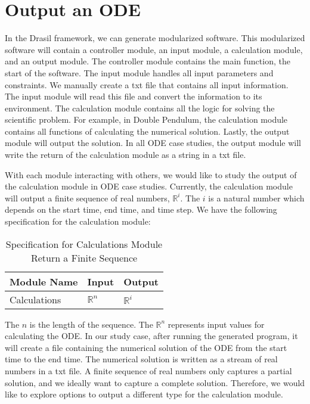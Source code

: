 \section{Output an ODE}
In the Drasil framework, we can generate modularized software. This modularized software will contain a controller module, an input module, a calculation module, and an output module. The controller module contains the main function, the start of the software. The input module handles all input parameters and constraints. We manually create a txt file that contains all input information. The input module will read this file and convert the information to its environment. The calculation module contains all the logic for solving the scientific problem. For example, in Double Pendulum, the calculation module contains all functions of calculating the numerical solution. Lastly, the output module will output the solution. In all ODE case studies, the output module will write the return of the calculation module as a string in a txt file. 

With each module interacting with others, we would like to study the output of the calculation module in ODE case studies. Currently, the calculation module will output a finite sequence of real numbers, $\mathbb{R}^i$. The $i$ is a natural number which depends on the start time, end time, and time step. We have the following specification for the calculation module:

\begin{table}[ht]
\centering
\begin{tabular}{p{} | p{} | p{}} \hline
    \textbf{Module Name}&\textbf{Input}&\textbf{Output}\\
    \toprule
    Calculations & $\mathbb{R}^n$ & $\mathbb{R}^i$ \\
    \bottomrule	
\end{tabular}	
\caption{Specification for Calculations Module Return a Finite Sequence}	
\label{tab_srsforcal}
\end{table}
The $n$ is the length of the sequence. The $\mathbb{R}^n$ represents input values for calculating the ODE. In our study case, after running the generated program, it will create a file containing the numerical solution of the ODE from the start time to the end time. The numerical solution is written as a stream of real numbers in a txt file. A finite sequence of real numbers only captures a partial solution, and we ideally want to capture a complete solution. Therefore, we would like to explore options to output a different type for the calculation module.

